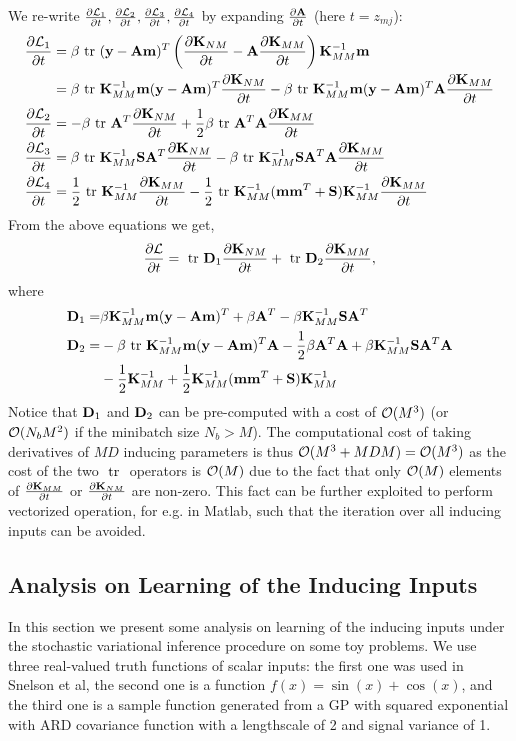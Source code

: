 \documentclass{article} %
\begin{document}
\noindent We re-write $\deriv{\calL_1}{t}, \deriv{\calL_2}{t}, \deriv{ \calL_3}{t}, \deriv{\calL_4}{t}$ by expanding $\deriv{\A}{t}$ (here $t = z_{mj}$):
\begin{align}
\nonumber
\deriv{\calL_1}{t}
 &= \beta \trace (\y - \A\m)^T \left(\deriv{\K_{NM}}{t} -  \A \deriv{ \K_{MM}}{t}\right)\K_{MM}^{-1} \m \\
&= \beta \trace \K_{MM}^{-1} \m (\y - \A\m)^T \deriv{\K_{NM}}{t} 
-\beta \trace \K_{MM}^{-1} \m (\y - \A\m)^T \A \deriv{\K_{MM}}{t} \\
\deriv{\calL_2}{t}
&= - \beta \trace \A^T \deriv{\K_{NM}}{t}
 + \frac{1}{2} \beta \trace \A^T \A \deriv{\K_{MM}}{t}  \\
\deriv{\calL_3}{t}
&= \beta \trace \K_{MM}^{-1} \S \A^T \deriv{\K_{NM}}{t}
 - \beta \trace \K_{MM}^{-1} \S \A^T \A \deriv{\K_{MM}}{t}\\
\deriv{\calL_4}{t}
 &= \frac{1}{2}  \trace \K_{MM}^{-1} \deriv{\K_{MM}}{t}
  - \frac{1}{2} \trace \K_{MM}^{-1} (\m \m^T + \S) \K_{MM}^{-1} \deriv{\K_{MM}}{t} 
\end{align}
From the above equations we get,
\begin{align}
\deriv{\calL}{t} = \trace \D_1 \deriv{\K_{NM}}{t} + \trace \D_2 \deriv{ \K_{MM}}{t},
\end{align}
where 
\begin{align}
\D_1 =& \beta \K_{MM}^{-1} \m (\y - \A\m)^T
 + \beta \A^T
 - \beta \K_{MM}^{-1} \S \A^T \\ \nonumber
\D_2 =& -\beta \trace \K_{MM}^{-1} \m (\y - \A\m)^T \A
 - \frac{1}{2} \beta \A^T \A
  + \beta \K_{MM}^{-1} \S \A^T \A	 \\ 
  &-\frac{1}{2} \K_{MM}^{-1} + \frac{1}{2} \K_{MM}^{-1} (\m \m^T + \S) \K_{MM}^{-1}
\end{align}
Notice that $\D_1$ and $\D_2$ can be pre-computed with a cost of $\calO(M^3)$ (or $\calO(N_bM^2)$ if the minibatch size $N_b > M$).
The computational cost of taking derivatives of $MD$ inducing parameters is thus $\calO(M^3 + MDM) = \calO(M^3)$ as the cost of the two $\trace$ operators is $\calO(M)$ due to the fact that only $\calO(M)$ elements of $\deriv{\K_{MM}}{t}$ or $\deriv{\K_{NM}}{t}$ are non-zero.
This fact can be further exploited to perform vectorized operation, for e.g. in Matlab, such that the iteration over all inducing inputs can be avoided.

\subsection{Analysis on Learning of the Inducing Inputs}
In this section we present some analysis on learning of the inducing inputs under the stochastic variational inference procedure on some toy problems.
We use three real-valued truth functions of scalar inputs: the first one was used in Snelson et al, the second one is a function $f(x) = \sin(x) + \cos(x)$, and the third one is a sample function generated from a GP with squared exponential with ARD covariance function with a lengthscale of 2 and signal variance of 1.
\end{document}
